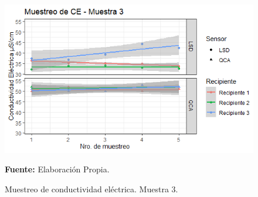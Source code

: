     \begin{figure}[H]
        \centering
        \includegraphics[width=0.75\linewidth]{Imagenes/cap4/CE_M3.png}
        \caption {Muestreo de conductividad el\'ectrica. Muestra 3. }{\textbf{Fuente:}
        Elaboraci\'on Propia. }
        \label{fig:M3CE}
    \end{figure}

